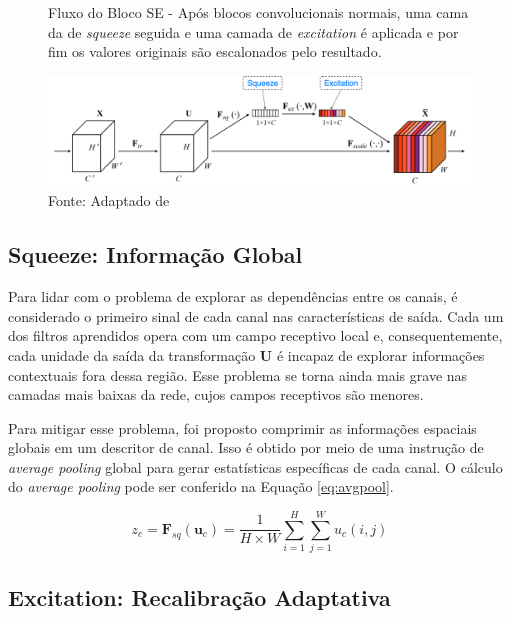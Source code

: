 \begin{figure}[h!]
    \caption{Fluxo do Bloco SE - Após blocos convolucionais normais, uma cama da de \textit{squeeze} seguida e uma camada de \textit{excitation} é aplicada e por fim os valores originais são escalonados pelo resultado.}
    \includegraphics[height=0.27\textwidth]{figures/fig025.png}
    \caption*{Fonte: Adaptado de \cite{huSqueezeandExcitationNetworks2018}}
    \label{fig:fig025}
\end{figure}


\subsection{Squeeze: Informação Global}
\label{subsec:squeeze}

Para lidar com o problema de explorar as dependências entre os canais, é considerado o primeiro sinal de cada canal nas características de saída. Cada um dos filtros aprendidos opera com um campo receptivo local e, consequentemente, cada unidade da saída da transformação $\mathbf{U}$ é incapaz de explorar informações contextuais fora dessa região. Esse problema se torna ainda mais grave nas camadas mais baixas da rede, cujos campos receptivos são menores.

Para mitigar esse problema, foi proposto comprimir as informações espaciais globais em um descritor de canal. Isso é obtido por meio de uma instrução de \textit{average pooling} global para gerar estatísticas específicas de cada canal. O cálculo do \textit{average pooling} pode ser conferido na Equação \ref{eq:avgpool}.

\begin{equation}
z_c = \mathbf{F}_{sq}(\mathbf{u}_c) = \frac{1}{H \times W} \sum_{i=1}^{H} \sum_{j=1}^{W} u_c(i, j)
\label{eq:avgpool}
\end{equation}

\subsection{Excitation: Recalibração Adaptativa}
\label{subsec:excitation}

